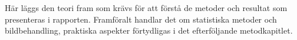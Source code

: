 \documentclass[../rapport_MVEX01-11-05]{subfiles}
\begin{document}
Här läggs den teori fram som krävs för att förstå de metoder
och resultat som presenteras i rapporten.
Framföralt handlar det om statistiska metoder och bildbehandling,
praktiska aspekter förtydligas i det efterföljande metodkapitlet.
\end{document}
